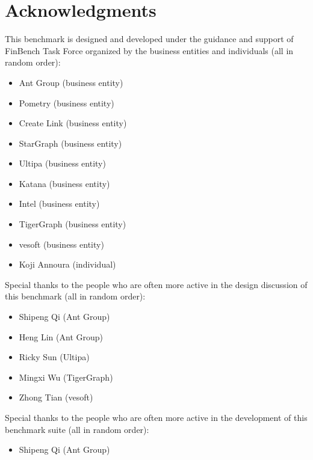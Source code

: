 \chapter*{Acknowledgments}

\renewcommand{\labelitemii}{\textbullet}

This benchmark is designed and developed under the guidance and support of
FinBench Task Force organized by the business entities and individuals (all
in random order):
\begin{itemize}
  \item Ant Group (business entity)
  \item Pometry (business entity)
  \item Create Link (business entity)
  \item StarGraph (business entity)
  \item Ultipa (business entity)
  \item Katana (business entity)
  \item Intel (business entity)
  \item TigerGraph (business entity)
  \item vesoft (business entity)
  \item Koji Annoura (individual)
\end{itemize}

Special thanks to the people who are often more active in the design
discussion of this benchmark (all in random order):

\begin{itemize}
  \item Shipeng Qi (Ant Group)
  \item Heng Lin (Ant Group)
  \item Ricky Sun (Ultipa)
  \item Mingxi Wu (TigerGraph)
  \item Zhong Tian (vesoft)
\end{itemize}

Special thanks to the people who are often more active in the development
of this benchmark suite (all in random order):

\begin{itemize}
  \item Shipeng Qi (Ant Group)
\end{itemize}